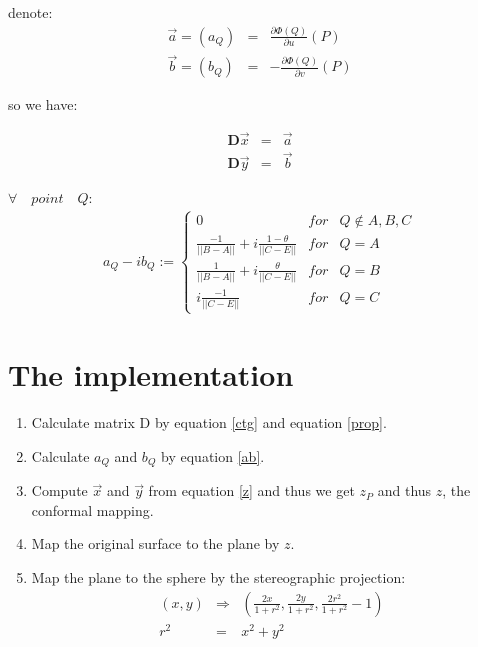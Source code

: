\documentclass{InsightArticle}
\begin{document}
\begin{enumerate}
    denote:
    \begin{eqnarray}
      \vec{a} = (a_Q) &=& \frac{\partial \Phi(Q)}{\partial u}(P) \nonumber \\
      \vec{b} = (b_Q) &=& -\frac{\partial \Phi(Q)}{\partial v} (P)
    \end{eqnarray}  

    so we have:

    \begin{eqnarray}
      \mathbf{D}\vec{x} &=& \vec{a} \nonumber \\
      \mathbf{D}\vec{y} &=& \vec{b} \label{z}
    \end{eqnarray}  

    $\forall \quad point \quad Q$:
    \begin{eqnarray}
      a_Q - ib_Q := \left\{
      \begin{array}{lcl}
        0 & for & Q \notin {A, B, C} \\
        \frac{-1}{||B-A||} + i\frac{1-\theta}{||C-E||} & for & Q = A \\
        \frac{1}{||B-A||} + i\frac{\theta}{||C-E||} & for & Q = B \\
        i\frac{-1}{||C-E||} & for & Q = C
      \end{array} \right. \label{ab}
    \end{eqnarray}  

  \end{enumerate}
  
  \section{The implementation}
  \begin{enumerate}
    \item Calculate matrix D by equation \ref{ctg} and equation \ref{prop}.
    \item Calculate $a_Q$ and $b_Q$ by equation \ref{ab}.
    \item Compute $\vec{x}$ and $\vec{y}$ from equation \ref{z} and
    thus we get $z_P$ and thus $z$, the conformal mapping.
    \item Map the original surface to the plane by $z$.
    \item Map the plane to the sphere by the stereographic projection:
    \begin{eqnarray}
      (x, y) &\Rightarrow& (\frac{2x}{1+r^2}, \frac{2y}{1+r^2},
      \frac{2r^2}{1+r^2}-1) \nonumber \\
      r^2 &=& x^2 + y^2
    \end{eqnarray}  

  \end{enumerate}
\end{document}
